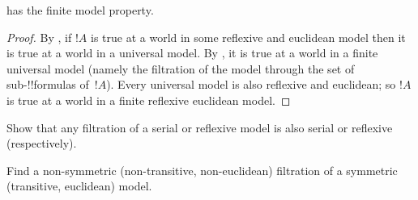 \documentclass[../../../include/open-logic-section]{subfiles}
\begin{document}
\begin{cor}
   has the finite model property.
\end{cor}

\begin{proof}
  By , if $!A$ is true at a world in
  some reflexive and euclidean model then it is true at a world in a
  universal model. By , it is true at a world in
  a finite universal model (namely the filtration of the model through
  the set of sub-!!{formula}s of~$!A$). Every universal model is also
  reflexive and euclidean; so $!A$ is true at a world in a finite
  reflexive euclidean model.
\end{proof}

\begin{prob}
  Show that any filtration of a serial or reflexive model is also
  serial or reflexive (respectively).
\end{prob}

\begin{prob}
  Find a non-symmetric (non-transitive, non-euclidean) filtration of a
  symmetric (transitive, euclidean) model.
\end{prob}
\end{document}
